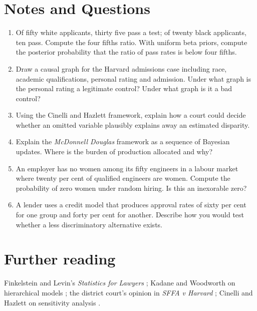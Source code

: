 \section*{Notes and Questions}
\begin{enumerate}[label=\arabic*.]
\item Of fifty white applicants, thirty five pass a test; of twenty black applicants, ten pass. Compute the four fifths ratio. With uniform beta priors, compute the posterior probability that the ratio of pass rates is below four fifths.
\item Draw a causal graph for the Harvard admissions case including race, academic qualifications, personal rating and admission. Under what graph is the personal rating a legitimate control? Under what graph is it a bad control?
\item Using the Cinelli and Hazlett framework, explain how a court could decide whether an omitted variable plausibly explains away an estimated disparity.
\item Explain the \emph{McDonnell Douglas} framework as a sequence of Bayesian updates. Where is the burden of production allocated and why?
\item An employer has no women among its fifty engineers in a labour market where twenty per cent of qualified engineers are women. Compute the probability of zero women under random hiring. Is this an inexorable zero?
\item A lender uses a credit model that produces approval rates of sixty per cent for one group and forty per cent for another. Describe how you would test whether a less discriminatory alternative exists.
\end{enumerate}

\section*{Further reading}
Finkelstein and Levin's \emph{Statistics for Lawyers} \citep{finkelstein2015}; Kadane and Woodworth on hierarchical models \citep{kadane2004}; the district court's opinion in \emph{SFFA v Harvard} \citep{sffa2019}; Cinelli and Hazlett on sensitivity analysis \citep{cinelli2020}.
